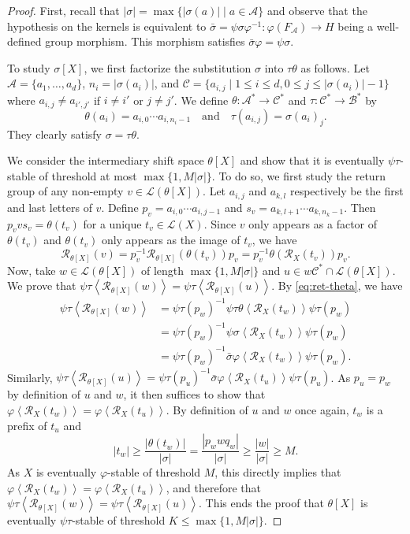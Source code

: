 \documentclass{amsart}
\newcommand*{\ret}{\mathcal{R}}
\newcommand*{\lang}{\mathcal{L}}
\newcommand*{\cA}{\mathcal{A}}
\newcommand*{\cB}{\mathcal{B}}
\newcommand*{\cC}{\mathcal{C}}
\newcommand*{\from}{\colon}
\newcommand*{\gen}[1]{\left\langle #1\right\rangle}
\theoremstyle{plain}
\theoremstyle{definition}
\theoremstyle{remark}
\begin{document}
\begin{proof}
    First, recall that $|\sigma| = \max\{|\sigma(a)| \mid a \in \cA\}$ and observe that the hypothesis on the kernels is equivalent to $\bar\sigma = \psi\sigma\varphi^{-1}\from \varphi(F_\cA) \to H$ being a well-defined group morphism. This morphism satisfies $\bar\sigma\varphi = \psi\sigma$.
    
    To study $\sigma[X]$, we first factorize the substitution $\sigma$ into $\tau\theta$ as follows.
    Let $\cA = \{a_1, \dots, a_d\}$, $n_i = |\sigma(a_i)|$, and $\cC = \{a_{i,j} \mid 1 \leq i \leq d, 0 \leq j \leq |\sigma(a_i)|-1\}$ where $a_{i,j} \ne a_{i',j'}$ if $i \ne i'$ or $j \ne j'$. We define $\theta\from \cA^*\to \cC^*$ and $\tau\from \cC^*\to \cB^*$ by
    \[
        \theta(a_i) = a_{i,0} \cdots a_{i,n_i-1}\quad\text{and}\quad \tau(a_{i,j}) = \sigma(a_i)_j.
    \]
    They clearly satisfy $\sigma = \tau\theta$.
    
    We consider the intermediary shift space $\theta[X]$ and show that it is eventually $\psi\tau$-stable of threshold at most $\max\{1,M|\sigma|\}$. To do so, we first study the return group of any non-empty $v \in \lang(\theta[X])$. Let $a_{i,j}$ and $a_{k,l}$ respectively be the first and last letters of $v$. Define $p_v = a_{i,0}\cdots a_{i,j-1}$ and $s_v = a_{k,l+1}\cdots a_{k,n_k-1}$. Then $p_vvs_v = \theta(t_v)$ for a unique $t_v\in\lang(X)$. Since $v$ only appears as a factor of $\theta(t_v)$ and $\theta(t_v)$ only appears as the image of $t_v$, we have
    \begin{equation}\label{eq:ret-theta}
        \ret_{\theta[X]}(v) = p_v^{-1}\ret_{\theta[X]}(\theta(t_v))p_v = p_v^{-1}\theta(\ret_X(t_v))p_v.
    \end{equation}
    Now, take $w \in \lang(\theta[X])$ of length $\max\{1,M|\sigma|\}$ and $u \in w\cC^* \cap \lang(\theta[X])$. We prove that $\psi\tau\gen{\ret_{\theta[X]}(w)} = \psi\tau\gen{\ret_{\theta[X]}(u)}$. By \cref{eq:ret-theta}, we have
    \begin{align*}
        \psi\tau\gen{\ret_{\theta[X]}(w)}
        &= \psi\tau(p_w)^{-1}\psi\tau\theta\gen{\ret_X(t_w)}\psi\tau(p_w) \\
        &= \psi\tau(p_w)^{-1}\psi\sigma\gen{\ret_X(t_w)}\psi\tau(p_w) \\
        &= \psi\tau(p_w)^{-1}\bar\sigma\varphi\gen{\ret_X(t_w)}\psi\tau(p_w).
    \end{align*}
    Similarly, $\psi\tau\gen{\ret_{\theta[X]}(u)} = \psi\tau(p_u)^{-1}\bar\sigma\varphi\gen{\ret_X(t_u)}\psi\tau(p_u)$.
    As $p_u = p_w$ by definition of $u$ and $w$, it then suffices to show that $\varphi\gen{\ret_X(t_w)} = \varphi\gen{\ret_X(t_u)}$. By definition of $u$ and $w$ once again, $t_w$ is a prefix of $t_u$ and
    \[
        |t_w| \geq \frac{|\theta(t_w)|}{|\sigma|} = \frac{|p_wwq_w|}{|\sigma|} \geq \frac{|w|}{|\sigma|}
        \geq M.
    \]
    As $X$ is eventually $\varphi$-stable of threshold $M$, this directly implies that $\varphi\gen{\ret_X(t_w)} = \varphi\gen{\ret_X(t_u)}$, and therefore that $\psi\tau\gen{\ret_{\theta[X]}(w)} = \psi\tau\gen{\ret_{\theta[X]}(u)}$. This ends the proof that $\theta[X]$ is eventually $\psi\tau$-stable of threshold $K \leq \max\{1,M|\sigma|\}$.
    

\end{proof}
\end{document}
